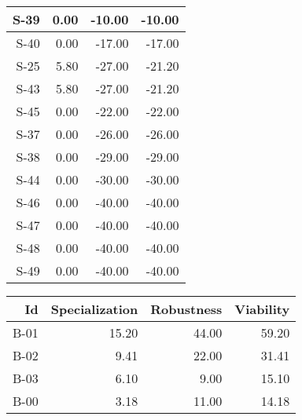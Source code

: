 \begin{tabular}{ | r | r | r | r | }
    \hline
                  S-39  &            0.00  &          -10.00  &          -10.00  \\
    \hline
                  S-40  &            0.00  &          -17.00  &          -17.00  \\
    \hline
                  S-25  &            5.80  &          -27.00  &          -21.20  \\
    \hline
                  S-43  &            5.80  &          -27.00  &          -21.20  \\
    \hline
                  S-45  &            0.00  &          -22.00  &          -22.00  \\
    \hline
                  S-37  &            0.00  &          -26.00  &          -26.00  \\
    \hline
                  S-38  &            0.00  &          -29.00  &          -29.00  \\
    \hline
                  S-44  &            0.00  &          -30.00  &          -30.00  \\
    \hline
                  S-46  &            0.00  &          -40.00  &          -40.00  \\
    \hline
                  S-47  &            0.00  &          -40.00  &          -40.00  \\
    \hline
                  S-48  &            0.00  &          -40.00  &          -40.00  \\
    \hline
                  S-49  &            0.00  &          -40.00  &          -40.00  \\
    \hline
\end{tabular}


\begin{tabular}{ | r | r | r | r | }
    \hline
                    Id  &  Specialization  &      Robustness  &       Viability  \\
    \hline
    \hline
                  B-01  &           15.20  &           44.00  &           59.20  \\
    \hline
                  B-02  &            9.41  &           22.00  &           31.41  \\
    \hline
                  B-03  &            6.10  &            9.00  &           15.10  \\
    \hline
                  B-00  &            3.18  &           11.00  &           14.18  \\
    \hline
\end{tabular}


